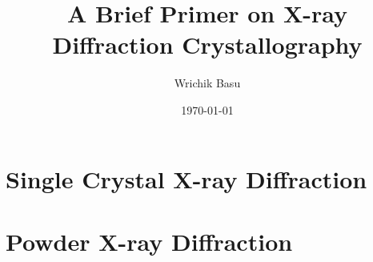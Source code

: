 \documentclass[11pt,a4paper]{article}
\begin{document}
	\title{A Brief Primer on X-ray Diffraction Crystallography}
	\author{Wrichik Basu}
	\date{\today}
	
	\maketitle
	\flushbottom
	
	
	
	
		
	
	
	
	
	
	
	
	
	
	
	\section{Single Crystal X-ray Diffraction}
	
		
		
		
	
		
		
		
		
		
		
		
	
	\section{Powder X-ray Diffraction}
	
		
		
	
	
	\medskip
	
	\printbibliography
		
\end{document}
